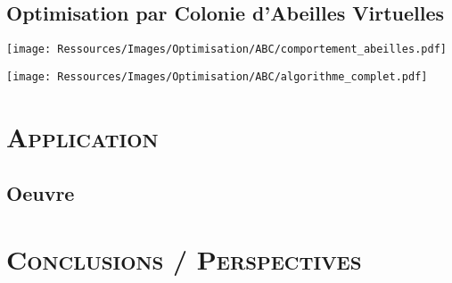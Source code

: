 \documentclass[xcolor=x11names, compress, 11pt]{beamer}
\begin{document}
\subsection{Optimisation par Colonie d’Abeilles Virtuelles}
\begin{frame}[c]
    \vfill
    \centering
    \texttt{[image: Ressources/Images/Optimisation/ABC/comportement\_abeilles.pdf]}
    \vfill
\end{frame}


\begin{frame}[c]
    \vfill
    \centering
    \texttt{[image: Ressources/Images/Optimisation/ABC/algorithme\_complet.pdf]}
    \vfill
\end{frame}



\section{\scshape Application}


\subsection{Oeuvre}
\begin{frame}[c]
    \vfill
    \vfill
\end{frame}


















\section{\scshape Conclusions / Perspectives}
\end{document}
